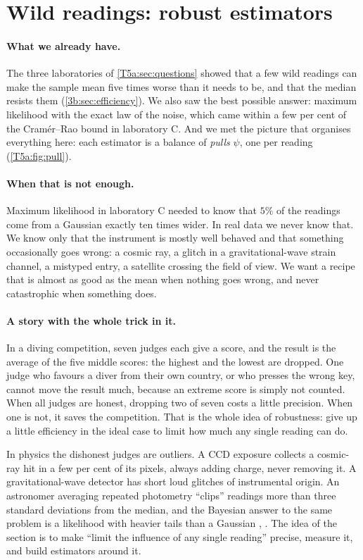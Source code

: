 \section{Wild readings: robust estimators}
\label{T5a:sec:robust}

\paragraph{What we already have.}
The three laboratories of \cref{T5a:sec:questions} showed that a few wild
readings can make the sample mean five times worse than it needs to be, and
that the median resists them (\cref{3b:sec:efficiency}). We also saw the
best possible answer: maximum likelihood with the exact law of the noise,
which came within a few per cent of the Cram\'er--Rao bound in laboratory C.
And we met the picture that organises everything here: each estimator is a
balance of \emph{pulls} $\psi$, one per reading (\cref{T5a:fig:pull}).

\paragraph{When that is not enough.}
Maximum likelihood in laboratory C needed to know that $5\%$ of the readings
come from a Gaussian exactly ten times wider. In real data we never know
that. We know only that the instrument is mostly well behaved and that
something occasionally goes wrong: a cosmic ray, a glitch in a gravitational-wave
strain channel, a mistyped entry, a satellite crossing the field of view.
We want a recipe that is almost as good as the mean when nothing goes
wrong, and never catastrophic when something does.

\paragraph{A story with the whole trick in it.}
In a diving competition, seven judges each give a score, and the result is
the average of the five middle scores: the highest and the lowest are
dropped. One judge who favours a diver from their own country, or who
presses the wrong key, cannot move the result much, because an extreme
score is simply not counted. When all judges are honest, dropping two of
seven costs a little precision. When one is not, it saves the competition.
That is the whole idea of robustness: give up a little efficiency in the
ideal case to limit how much any single reading can do.

In physics the dishonest judges are outliers. A CCD exposure collects a
cosmic-ray hit in a few per cent of its pixels, always adding charge, never
removing it. A gravitational-wave detector has short loud glitches of
instrumental origin. An astronomer averaging repeated photometry ``clips''
readings more than three standard deviations from the median, and the
Bayesian answer to the same problem is a likelihood with heavier tails than
a Gaussian , . The idea of the section is to make ``limit the influence of any
single reading'' precise, measure it, and build estimators around it.

